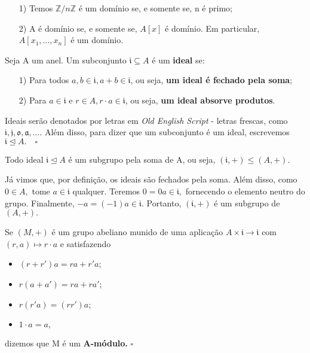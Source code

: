 \documentclass[AlgebraII/algebraII_notes.tex]{subfiles}
\begin{document}
\begin{example}[Exercício]
	\begin{itemize}
		\item[1)] Temos \(\mathbb{Z}/n \mathbb{Z}\) é um domínio se, e somente se, n é primo;
		\item[2)] A é domínio se, e somente se, \(A[x]\) é domínio. Em particular, \(A[x_{1}, \dotsc , x_{n}]\) é um domínio.
	\end{itemize}
\end{example}
\begin{def*}
	Seja A um anel. Um subconjunto \(\mathfrak{i}\subseteq{A}\) é um \textbf{ideal} se:
	\begin{itemize}
		\item[1)] Para todos \(a, b\in \mathfrak{i}, a + b\in \mathfrak{i}\), ou seja, \textbf{um ideal é fechado pela soma};
		\item[2)] Para \(a\in \mathfrak{i}\) e \(r\in A, r \cdot a\in \mathfrak{i}\), ou seja, \textbf{um ideal absorve produtos}.
	\end{itemize}
	Ideais serão denotados por letras em \textit{Old English Script} - letras frescas, como \(\mathfrak{i}, \mathfrak{j}, \mathfrak{o}, \mathfrak{a}, \dotsc\).
	Além disso, para dizer que um subconjunto é um ideal, escrevemos \(\mathfrak{i} \trianglelefteq{A}.\quad\square\)
\end{def*}
\begin{prop*}
	Todo ideal \(\mathfrak{i}\trianglelefteq{A}\) é um subgrupo pela soma de A, ou seja, \((\mathfrak{i}, +)\leq (A, +).\)
\end{prop*}
\begin{proof*}
	Já vimos que, por definição, os ideais são fechados pela soma. Além disso, como \(0\in A,\)
	tome \(a\in \mathfrak{i}\) qualquer. Teremos \(0 = 0a\in \mathfrak{i},\) fornecendo o elemento neutro do grupo.
	Finalmente, \(-a = (-1)a\in \mathfrak{i}\). Portanto, \((\mathfrak{i}, +)\) é um subgrupo de \((A, +).\) \qedsymbol
\end{proof*}
\begin{def*}
	Se \((M, +)\) é um grupo abeliano munido de uma aplicação \(A\times \mathfrak{i}\longrightarrow \mathfrak{i}\) com \((r, a)\mapsto r \cdot a\)
	e satisfazendo
	\begin{itemize}
		\item \((r + r')a = ra + r'a\);
		\item \(r(a + a') = ra + ra'\);
		\item \(r(r'a) = (rr')a\);
		\item \(1 \cdot a = a,\)
	\end{itemize}
	dizemos que M é um \textbf{A-módulo.} \(\square\)
\end{def*}
\end{document}
